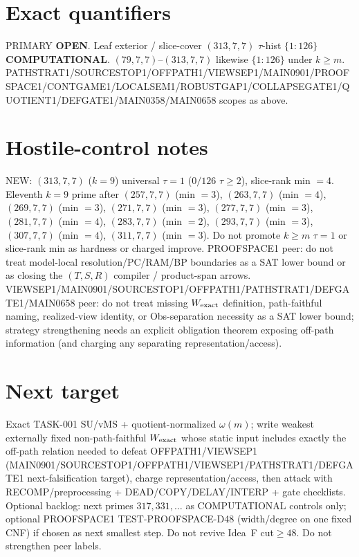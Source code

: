 \documentclass[11pt]{article}
\begin{document}
\section*{Exact quantifiers}
PRIMARY \textbf{OPEN}. Leaf exterior / slice-cover $(313,7,7)$ $\tau$-hist $\{1{:}126\}$ \textbf{COMPUTATIONAL}.
$(79,7,7)$--$(313,7,7)$ likewise $\{1{:}126\}$ under $k{\ge}m$.
PATHSTRAT1/SOURCESTOP1/OFFPATH1/VIEWSEP1/MAIN0901/PROOFSPACE1/CONTGAME1/LOCALSEM1/ROBUSTGAP1/COLLAPSEGATE1/QUOTIENT1/DEFGATE1/MAIN0358/MAIN0658 scopes as above.

\section*{Hostile-control notes}
NEW: $(313,7,7)$ ($k{=}9$) universal $\tau{=}1$ ($0/126$ $\tau{\ge}2$), slice-rank min $=4$.
Eleventh $k{=}9$ prime after $(257,7,7)$ (min $=3$), $(263,7,7)$ (min $=4$), $(269,7,7)$ (min $=3$), $(271,7,7)$ (min $=3$), $(277,7,7)$ (min $=3$), $(281,7,7)$ (min $=4$), $(283,7,7)$ (min $=2$), $(293,7,7)$ (min $=3$), $(307,7,7)$ (min $=4$), $(311,7,7)$ (min $=3$).
Do not promote $k{\ge}m$ $\tau{=}1$ or slice-rank min as hardness or charged improve.
PROOFSPACE1 peer: do not treat model-local resolution/PC/RAM/BP boundaries as a SAT lower bound
or as closing the $(T,S,R)$ compiler / product-span arrows.
VIEWSEP1/MAIN0901/SOURCESTOP1/OFFPATH1/PATHSTRAT1/DEFGATE1/MAIN0658 peer: do not treat missing $W_{\rm exact}$ definition,
path-faithful naming, realized-view identity, or Obs-separation necessity as a SAT lower bound;
strategy strengthening needs an explicit obligation theorem exposing off-path information
(and charging any separating representation/access).

\section*{Next target}
Exact TASK-001 SU/vMS + quotient-normalized $\omega(m)$; write weakest externally fixed non-path-faithful
$W_{\rm exact}$ whose static input includes exactly the off-path relation needed to defeat OFFPATH1/VIEWSEP1
(MAIN0901/SOURCESTOP1/OFFPATH1/VIEWSEP1/PATHSTRAT1/DEFGATE1 next-falsification target), charge representation/access,
then attack with RECOMP/preprocessing + DEAD/COPY/DELAY/INTERP + gate checklists.
Optional backlog: next primes $317,331,\ldots$ as COMPUTATIONAL controls only;
optional PROOFSPACE1 TEST-PROOFSPACE-D48 (width/degree on one fixed CNF) if chosen as next smallest step.
Do not revive Idea~F cut$\ge48$. Do not strengthen peer labels.
\end{document}

